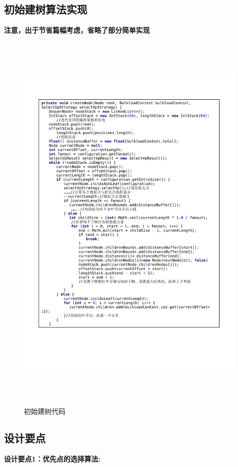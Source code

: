 \subsection{初始建树算法实现}
\textbf{注意，出于节省篇幅考虑，省略了部分简单实现}
\begin{figure}[H]
  \centering
  \includegraphics[width=6in,height=7.6in]{new_FIGs/chapter4/initVpTree-code.pdf}
  \caption{初始建树代码}\label{create-node-code}
\end{figure}
\subsection{设计要点}
\textbf{设计要点1：优先点的选择算法:}

